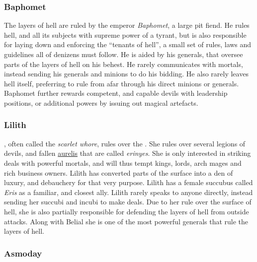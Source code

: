 \subsubsection{Baphomet}
\label{sec:Baphomet}

The layers of hell are ruled by the emperor \emph{Baphomet}, a large pit
fiend. He rules hell, and all its subjects with supreme power of a tyrant, but
is also responsible for laying down and enforcing the ``tenants of hell'',
a small set of rules, laws and guidelines all of denizens must follow. He
is aided by his generals, that oversee parts of the layers of hell on his
behest. He rarely communicates with mortals, instead sending his generals and
minions to do his bidding. He also rarely leaves hell itself, preferring to
rule from afar through his direct minions or generals. Baphomet further
rewards competent, and capable devils with leadership positions, or additional
powers by issuing out magical artefacts.

\subsubsection{Lilith}

, often called the \emph{scarlet whore}, rules over the
. She rules over several legions of devils, and
fallen \hyperref[sec:Aurelis]{aurelis} that are called \emph{erinyes}. She is
only interested in striking deals with powerful mortals, and will thus tempt
kings, lords, arch mages and rich business owners. Lilith has converted parts
of the surface into a den of luxury, and debauchery for that very purpose.
Lilith has a female succubus called \emph{Eris} as a familiar, and closest
ally. Lilith rarely speaks to anyone directly, instead sending her succubi and
incubi to make deals. Due to her rule over the surface of hell, she is also
partially responsible for defending the layers of hell from outside
attacks. Along with Belial she is one of the most powerful generals that rule
the layers of hell.

\subsubsection{Asmoday}
\label{sec:Asmoday}

